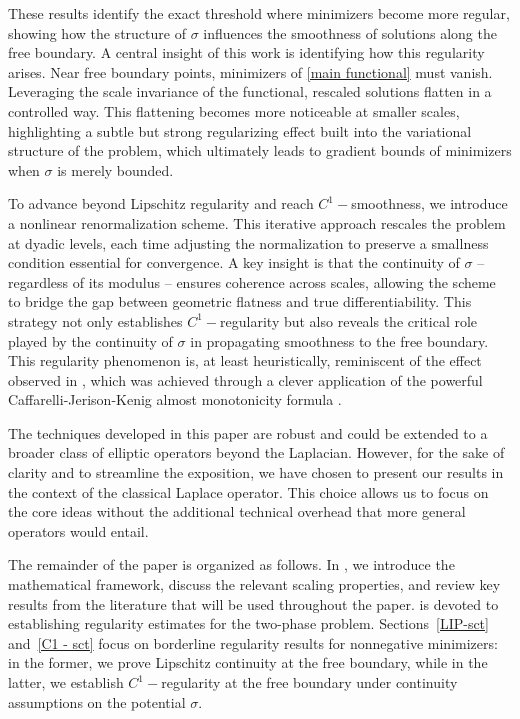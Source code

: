 \documentclass[reqno,11pt]{amsart}
\newcommand{\1}{\mathds{1}}  %
\numberwithin{equation}{section}
\begin{document}
These results identify the exact threshold where minimizers become more regular, showing how the structure of $\sigma$ influences the smoothness of solutions along the free boundary. A central insight of this work is identifying how this regularity arises. Near free boundary points, minimizers of \eqref{main functional} must vanish. Leveraging the scale invariance of the functional, rescaled solutions flatten in a controlled way. This flattening becomes more noticeable at smaller scales, highlighting a subtle but strong regularizing effect built into the variational structure of the problem, which ultimately leads to gradient bounds of minimizers when $\sigma$ is merely bounded.

To advance beyond Lipschitz regularity and reach $C^1-$smoothness, we introduce a nonlinear renormalization scheme. This iterative approach rescales the problem at dyadic levels, each time adjusting the normalization to preserve a smallness condition essential for convergence. A key insight is that the continuity of $\sigma$ -- regardless of its modulus -- ensures coherence across scales, allowing the scheme to bridge the gap between geometric flatness and true differentiability. This strategy not only establishes $C^1-$regularity but also reveals the critical role played by the continuity of $\sigma$ in propagating smoothness to the free boundary. This regularity phenomenon is, at least heuristically, reminiscent of the effect observed in \cite{SH03}, which was achieved through a clever application of the powerful Caffarelli-Jerison-Kenig almost monotonicity formula \cite{CJK}.

The techniques developed in this paper are robust and could be extended to a broader class of elliptic operators beyond the Laplacian. However, for the sake of clarity and to streamline the exposition, we have chosen to present our results in the context of the classical Laplace operator. This choice allows us to focus on the core ideas without the additional technical overhead that more general operators would entail.

The remainder of the paper is organized as follows. In , we introduce the mathematical framework, discuss the relevant scaling properties, and review key results from the literature that will be used throughout the paper.  is devoted to establishing regularity estimates for the two-phase problem. Sections~\ref{LIP-sct} and~\ref{C1 - sct} focus on borderline regularity results for nonnegative minimizers: in the former, we prove Lipschitz continuity at the free boundary, while in the latter, we establish $C^1-$regularity at the free boundary under continuity assumptions on the potential $\sigma$.
\end{document}
